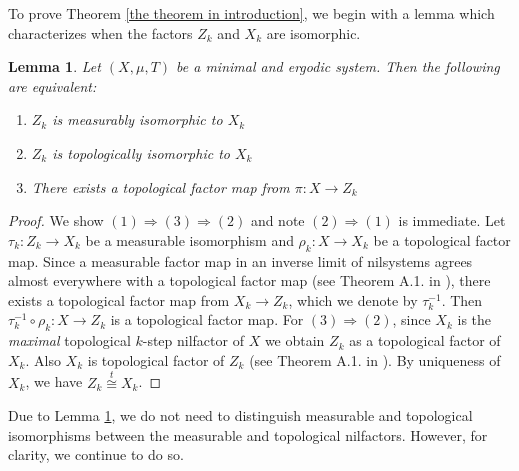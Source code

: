 \documentclass[12pt]{amsart}
\theoremstyle{definition}
\theoremstyle{plain}
\newtheorem{lemma}[theorem]{Lemma}
\theoremstyle{definition}
\numberwithin{equation}{section}
\begin{document}
To prove Theorem \ref{the theorem in introduction}, we begin with a lemma which characterizes when the factors $Z_k$ and $X_k$ are isomorphic.
 \begin{lemma} \label{Zk and Xk measurably iso iff cont factor map}
        Let $(X,\mu,T)$ be a minimal and ergodic system. Then the following are equivalent: 
        \begin{enumerate}
    \item $Z_k$ is measurably isomorphic to $X_k$
    \item $Z_k$ is topologically isomorphic to $X_k$
    \item There exists a topological factor map from $\pi\colon X \rightarrow Z_k$
\end{enumerate}

\end{lemma}

\begin{proof}
     We show $(1) \Rightarrow (3) \Rightarrow (2)$ and note $(2) \Rightarrow (1)$ is immediate. Let $\tau_{k}\colon Z_k \rightarrow X_k$ be a measurable isomorphism and $\rho_k\colon X \rightarrow X_k$ be a topological factor map. Since a measurable factor map in an inverse limit of nilsystems agrees almost everywhere with a topological factor map (see Theorem A.1. in \cite{Host Kra and Maass}), there exists a topological factor map from $X_k \rightarrow Z_k$, which we denote by $\tau_{k} ^{-1}$. Then $\tau_{k}^{-1} \circ \rho_k\colon X \rightarrow Z_k$ is a topological factor map. For $(3) \Rightarrow (2)$, since $X_k$ is the \textit{maximal} topological $k$-step nilfactor of $X$ we obtain $Z_k$ as a topological factor of $X_k$. Also $X_k$ is topological factor of $Z_k$ (see Theorem A.1. in \cite{Host Kra and Maass}). By uniqueness of $X_k$, we have $Z_k \overset{t}\cong X_k$.
\end{proof}

Due to Lemma \ref{Zk and Xk measurably iso iff cont factor map}, we do not need to distinguish measurable and topological isomorphisms between the measurable and topological nilfactors. However, for clarity, we continue to do so.
\end{document}
